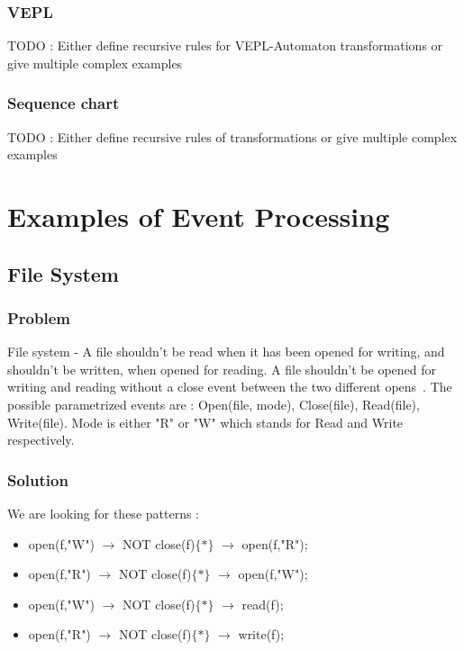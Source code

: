 			\subsubsection{VEPL}
				TODO : Either define recursive rules for VEPL-Automaton transformations or give multiple complex examples 
			\subsubsection{Sequence chart}
				TODO : Either define recursive rules of transformations  or give multiple complex examples
			
	\section{Examples of Event Processing}
 
 
		\subsection{File System}
			\subsubsection{Problem}
				File system - A file shouldn't be read when it has been opened for writing, and shouldn't be written, when opened for reading. 
				A file shouldn't be opened for writing and reading without a close event between the two different opens~\citep{marq}.
				The possible parametrized events are : 
				Open(file, mode), 
				Close(file), 
				Read(file), 
				Write(file). 
				Mode is either "R" or "W" which stands for Read and Write respectively.
			\subsubsection{Solution}
				We are looking for these patterns :

				\begin{itemize}
					\item open(f,"W") $\rightarrow$ NOT close(f)$\{\ast\}$ $\rightarrow$ open(f,"R");
					\item open(f,"R") $\rightarrow$ NOT close(f)$\{\ast\}$ $\rightarrow$ open(f,"W");
					\item open(f,"W") $\rightarrow$ NOT close(f)$\{\ast\}$ $\rightarrow$ read(f);
					\item open(f,"R") $\rightarrow$ NOT close(f)$\{\ast\}$ $\rightarrow$ write(f);
				\end{itemize}

